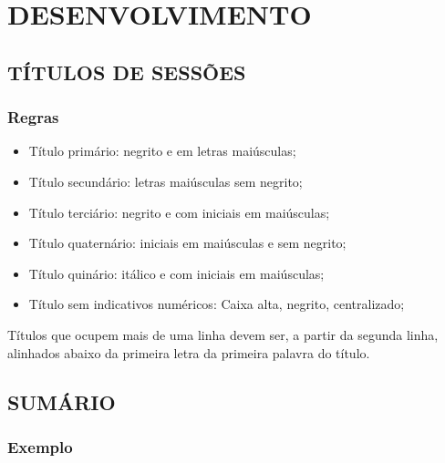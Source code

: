 \section{DESENVOLVIMENTO}

\lipsum[2] 

\lipsum[3]

\subsection{TÍTULOS DE SESSÕES}

\subsubsection{Regras}

\begin{itemize} 
    \item Título primário: negrito e em letras maiúsculas;
    \item Título secundário: letras maiúsculas sem negrito;
    \item Título terciário: negrito e com iniciais em maiúsculas;
    \item Título quaternário: iniciais em maiúsculas e sem negrito;
    \item Título quinário: itálico e com iniciais em maiúsculas;
    \item Título sem indicativos numéricos: Caixa alta, negrito, centralizado;
\end{itemize}

Títulos que ocupem mais de uma linha devem ser, a partir da segunda linha, alinhados abaixo da primeira letra da primeira palavra do título.

\newpage

\subsection{SUMÁRIO}

\subsubsection{Exemplo}

